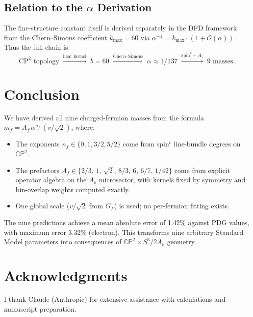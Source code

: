 \documentclass[11pt,a4paper]{article}
\newcommand{\CP}{\mathbb{CP}}
\begin{document}
\subsection{Relation to the $\alpha$ Derivation}

The fine-structure constant itself is derived separately in the DFD framework
from the Chern--Simons coefficient $k_{\max} = 60$ via
$\alpha^{-1} = k_{\max}\cdot(1 + \mathcal{O}(\alpha))$.  Thus the full chain
is:
\[
\text{CP}^2\text{ topology} \;\xrightarrow{\text{heat kernel}}\; b = 60
\;\xrightarrow{\text{Chern--Simons}}\; \alpha \approx 1/137
\;\xrightarrow{\text{spin}^c + A_5}\; \text{9 masses}\,.
\]


\section{Conclusion}
\label{sec:conclusion}

We have derived all nine charged-fermion masses from the formula
$m_f = A_f\,\alpha^{n_f}\,(v/\sqrt{2})$, where:
\begin{itemize}
\item The exponents $n_f\in\{0,1,3/2,5/2\}$ come from spin$^c$ line-bundle
      degrees on $\CP^2$.
\item The prefactors $A_f\in\{2/3,\,1,\,\sqrt{2},\,8/3,\,6,\,6/7,\,1/42\}$
      come from explicit operator algebra on the $A_5$ microsector, with
      kernels fixed by symmetry and bin-overlap weights computed exactly.
\item One global scale ($v/\sqrt{2}$ from $G_F$) is used; no per-fermion
      fitting exists.
\end{itemize}

The nine predictions achieve a mean absolute error of 1.42\% against PDG values,
with maximum error 3.32\% (electron).  This transforms nine arbitrary Standard
Model parameters into consequences of $\CP^2\times S^3/2A_5$ geometry.


\section*{Acknowledgments}

I thank Claude (Anthropic) for extensive assistance with calculations and
manuscript preparation.
\end{document}
